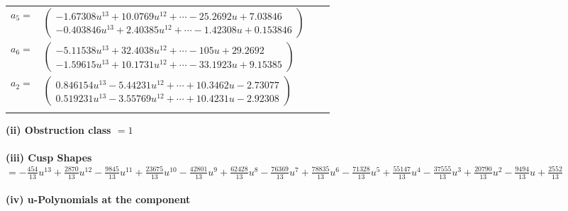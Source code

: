 \documentclass[1p]{elsarticle_modified}
\theoremstyle{definition}
\begin{document}
\begin{tabular}{m{7pt} m{180pt} m{7pt} m{180pt} }
\flushright $a_{5}=$&$\begin{pmatrix}-1.67308 u^{13}+10.0769 u^{12}+\cdots-25.2692 u+7.03846\\-0.403846 u^{13}+2.40385 u^{12}+\cdots-1.42308 u+0.153846\end{pmatrix}$ \\
\flushright $a_{6}=$&$\begin{pmatrix}-5.11538 u^{13}+32.4038 u^{12}+\cdots-105 u+29.2692\\-1.59615 u^{13}+10.1731 u^{12}+\cdots-33.1923 u+9.15385\end{pmatrix}$ \\
\flushright $a_{2}=$&$\begin{pmatrix}0.846154 u^{13}-5.44231 u^{12}+\cdots+10.3462 u-2.73077\\0.519231 u^{13}-3.55769 u^{12}+\cdots+10.4231 u-2.92308\end{pmatrix}$\\&\end{tabular}
\flushleft \textbf{(ii) Obstruction class $= 1$}\\~\\
\flushleft \textbf{(iii) Cusp Shapes $= -\frac{454}{13} u^{13}+\frac{2870}{13} u^{12}-\frac{9845}{13} u^{11}+\frac{23675}{13} u^{10}-\frac{42801}{13} u^9+\frac{62428}{13} u^8-\frac{76369}{13} u^7+\frac{78835}{13} u^6-\frac{71328}{13} u^5+\frac{55147}{13} u^4-\frac{37555}{13} u^3+\frac{20790}{13} u^2-\frac{9494}{13} u+\frac{2552}{13}$}\\~\\
\newpage\renewcommand{\arraystretch}{1}
\flushleft \textbf{(iv) u-Polynomials at the component}\newline \\
\end{document}
